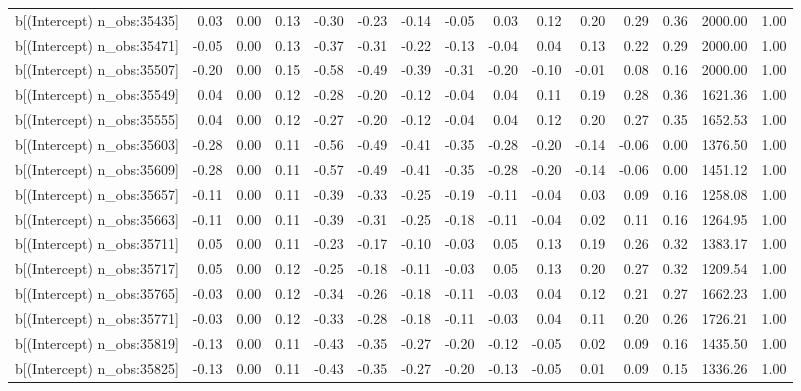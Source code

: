 \begin{table}[ht]
\begin{tabular}{rrrrrrrrrrrrrrr}
  b[(Intercept) n\_obs:35435] & 0.03 & 0.00 & 0.13 & -0.30 & -0.23 & -0.14 & -0.05 & 0.03 & 0.12 & 0.20 & 0.29 & 0.36 & 2000.00 & 1.00 \\ 
  b[(Intercept) n\_obs:35471] & -0.05 & 0.00 & 0.13 & -0.37 & -0.31 & -0.22 & -0.13 & -0.04 & 0.04 & 0.13 & 0.22 & 0.29 & 2000.00 & 1.00 \\ 
  b[(Intercept) n\_obs:35507] & -0.20 & 0.00 & 0.15 & -0.58 & -0.49 & -0.39 & -0.31 & -0.20 & -0.10 & -0.01 & 0.08 & 0.16 & 2000.00 & 1.00 \\ 
  b[(Intercept) n\_obs:35549] & 0.04 & 0.00 & 0.12 & -0.28 & -0.20 & -0.12 & -0.04 & 0.04 & 0.11 & 0.19 & 0.28 & 0.36 & 1621.36 & 1.00 \\ 
  b[(Intercept) n\_obs:35555] & 0.04 & 0.00 & 0.12 & -0.27 & -0.20 & -0.12 & -0.04 & 0.04 & 0.12 & 0.20 & 0.27 & 0.35 & 1652.53 & 1.00 \\ 
  b[(Intercept) n\_obs:35603] & -0.28 & 0.00 & 0.11 & -0.56 & -0.49 & -0.41 & -0.35 & -0.28 & -0.20 & -0.14 & -0.06 & 0.00 & 1376.50 & 1.00 \\ 
  b[(Intercept) n\_obs:35609] & -0.28 & 0.00 & 0.11 & -0.57 & -0.49 & -0.41 & -0.35 & -0.28 & -0.20 & -0.14 & -0.06 & 0.00 & 1451.12 & 1.00 \\ 
  b[(Intercept) n\_obs:35657] & -0.11 & 0.00 & 0.11 & -0.39 & -0.33 & -0.25 & -0.19 & -0.11 & -0.04 & 0.03 & 0.09 & 0.16 & 1258.08 & 1.00 \\ 
  b[(Intercept) n\_obs:35663] & -0.11 & 0.00 & 0.11 & -0.39 & -0.31 & -0.25 & -0.18 & -0.11 & -0.04 & 0.02 & 0.11 & 0.16 & 1264.95 & 1.00 \\ 
  b[(Intercept) n\_obs:35711] & 0.05 & 0.00 & 0.11 & -0.23 & -0.17 & -0.10 & -0.03 & 0.05 & 0.13 & 0.19 & 0.26 & 0.32 & 1383.17 & 1.00 \\ 
  b[(Intercept) n\_obs:35717] & 0.05 & 0.00 & 0.12 & -0.25 & -0.18 & -0.11 & -0.03 & 0.05 & 0.13 & 0.20 & 0.27 & 0.32 & 1209.54 & 1.00 \\ 
  b[(Intercept) n\_obs:35765] & -0.03 & 0.00 & 0.12 & -0.34 & -0.26 & -0.18 & -0.11 & -0.03 & 0.04 & 0.12 & 0.21 & 0.27 & 1662.23 & 1.00 \\ 
  b[(Intercept) n\_obs:35771] & -0.03 & 0.00 & 0.12 & -0.33 & -0.28 & -0.18 & -0.11 & -0.03 & 0.04 & 0.11 & 0.20 & 0.26 & 1726.21 & 1.00 \\ 
  b[(Intercept) n\_obs:35819] & -0.13 & 0.00 & 0.11 & -0.43 & -0.35 & -0.27 & -0.20 & -0.12 & -0.05 & 0.02 & 0.09 & 0.16 & 1435.50 & 1.00 \\ 
  b[(Intercept) n\_obs:35825] & -0.13 & 0.00 & 0.11 & -0.43 & -0.35 & -0.27 & -0.20 & -0.13 & -0.05 & 0.01 & 0.09 & 0.15 & 1336.26 & 1.00 \\ 

\end{tabular}
\end{table}
